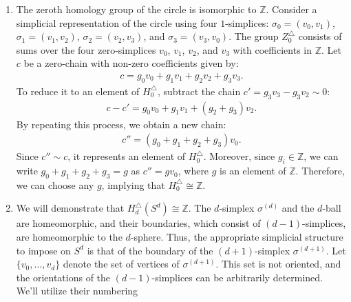 \begin{example}\noindent
	\begin{enumerate}
		\item The zeroth homology group of the circle is isomorphic to \(\mathbb{Z}\).
		      Consider a simplicial representation of the circle using four \(1\)-simplices:
		      \(\sigma_{0} = (v_{0}, v_{1})\), \(\sigma_{1} = (v_{1}, v_{2})\), \(\sigma_{2} = (v_{2}, v_{3})\), and \(\sigma_{3} = (v_{3}, v_{0})\).
		      The group \(Z^{\triangle}_{0}\) consists of sums over the four zero-simplices \(v_{0}\),
		      \(v_{1}\), \(v_{2}\), and \(v_{3}\) with coefficients in \(\mathbb{Z}\). Let \(c\) be a zero-chain
		      with non-zero coefficients given by:
		      \begin{align}
		      	c = g_{0} v_{0} + g_{1} v_{1} + g_{2} v_{2} + g_{3} v_{3}. 
		      \end{align}
		      To reduce it to an element of \(H^{\triangle}_{0}\), subtract the chain \(c' =  g_{3} v_{3} - g_{3} v_{2} \sim 0\):
		      \begin{align}
		      	c - c' = g_{0} v_{0} + g_{1} v_{1} + (g_{2} + g_{3}) v_{2}. 
		      \end{align}
		      By repeating this process, we obtain a new chain:
		      \begin{align}
		      	c'' = (g_{0} + g_{1} + g_{2} + g_{3}) v_{0}. 
		      \end{align}
		      Since \(c'' \sim c\), it represents an element of \(H^{\triangle}_{0}\). Moreover,
		      since \(g_{i} \in \mathbb{Z}\), we can write
		      \(g_{0} + g_{1} + g_{2} + g_{3} = g\) as \(c'' = g v_{0}\), where \(g\)
		      is an element of \(\mathbb{Z}\). Therefore, we can choose any \(g\), implying
		      that \(H^{\triangle}_{0} \cong \mathbb{Z}\).		      		      		      
		\item We will demonstrate that \(H^{\triangle}_{d}(S^{d}) \cong \mathbb{Z}\). The
		      \(d\)-simplex \(\sigma^{(d)}\) and the \(d\)-ball are homeomorphic, and their boundaries,
		      which consist of \((d-1)\)-simplices, are homeomorphic to the \(d\)-sphere.
		      Thus, the appropriate simplicial structure to impose on \(S^{d}\) is that of
		      the boundary of the \((d+1)\)-simplex \(\sigma^{(d+1)}\). Let
		      \(\{v_{0}, \ldots, v_{d}\}\) denote the set of vertices of
		      \(\sigma^{(d+1)}\). This set is not oriented, and the orientations of the
		      \((d-1)\)-simplices can be arbitrarily determined. We'll utilize their numbering

\end{enumerate}
\end{example}
